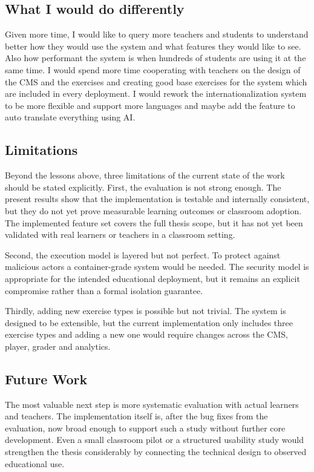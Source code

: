 \subsection{What I would do differently}
Given more time, I would like to query more teachers and students to understand better how they would
use the system and what features they would like to see.
Also how performant the system is when hundreds of students are using it at the same time.
I would spend more time cooperating with teachers on the design of the CMS and the exercises and creating good
base exercises for the system which are included in every deployment.
I would rework the internationalization system to be more flexible and support more languages and maybe add the feature to
auto translate everything using AI.

\subsection{Limitations}
Beyond the lessons above, three limitations of the current state of the work should be stated explicitly.
First, the evaluation is not strong enough. The present results show that the implementation is testable and 
internally consistent, but they do not yet prove measurable learning outcomes or classroom adoption.
The implemented feature set covers the full thesis scope, but it has not yet been validated with real learners 
or teachers in a classroom setting.

Second, the execution model is layered but not perfect. To protect against malicious actors a container-grade system 
would be needed. The security model is appropriate for the intended educational deployment, but it remains an explicit 
compromise rather than a formal isolation guarantee.

Thirdly, adding new exercise types is possible but not trivial. The system is designed to be extensible,
but the current implementation only includes three exercise types and adding a new one would require changes across the 
CMS, player, grader and analytics.


\subsection{Future Work}
The most valuable next step is more systematic evaluation with actual learners and teachers.
The implementation itself is, after the bug fixes from the evaluation, now broad enough to support such a study without 
further core development. Even a small classroom pilot or a structured usability study would strengthen the 
thesis considerably by connecting the technical design to observed educational use.

